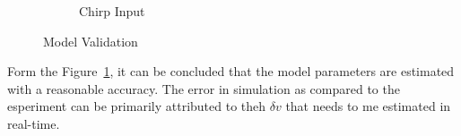 \begin{figure}[H]
\begin{minipage}{0.49\textwidth}
\begin{figure}[H]
            \caption*{Chirp Input}
        \end{figure}
    \end{minipage}
    \caption{Model Validation}
    \label{fig::model_valid}
\end{figure}

Form the Figure~\ref{fig::model_valid}, it can be concluded that the model parameters are estimated with a reasonable accuracy. The error in simulation as compared to the esperiment can be primarily attributed to theh $\delta v$ that needs to me estimated in real-time.
